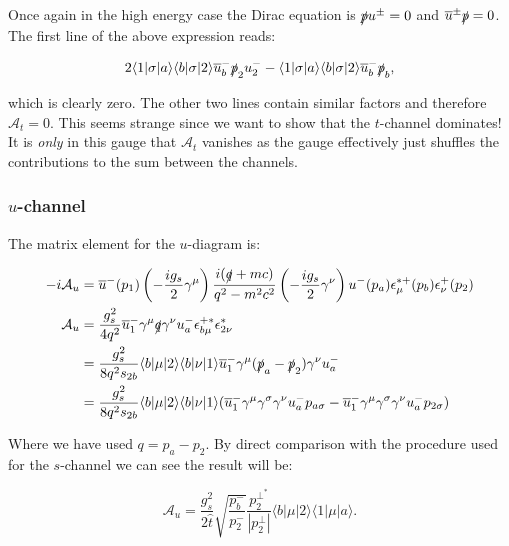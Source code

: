 			Once again in the high energy case the Dirac equation is $\slashed pu^\pm=0$ and $\overline{u}^\pm\slashed p=0$.  The first line of the above expression reads:

			\begin{equation}
			2\langle1|\sigma|a\rangle\langle b|\sigma|2\rangle\overline{u}^-_b\slashed p_2u^-_2 - \langle1|\sigma|a\rangle\langle b|\sigma|2\rangle\overline{u}^-_b\slashed p_b,
			\end{equation}

			which is clearly zero.  The other two lines contain similar factors and therefore $\mathcal{A}_t=0$.
			This seems strange since we want to show that the $t$-channel dominates!  It is \emph{only} in this
			gauge that $\mathcal{A}_t$ vanishes as the gauge effectively just shuffles the contributions to the
			sum between the channels.

		\subsubsection{$u$-channel}

		The matrix element for the $u$-diagram is:

			\begin{equation}
			\begin{split}
			-i\mathcal{A}_u &= \overline{u}^-(p_1)\left(-\frac{ig_s}{2}\gamma^\mu\right)\frac{i(\slashed q+mc)}{q^2-m^2c^2}\left(-\frac{ig_s}{2}\gamma^\nu\right)u^-(p_a)\epsilon_\mu^{*+}(p_b)\epsilon^+_\nu(p_2)\\
			\mathcal{A}_u &= \frac{g_s^2}{4q^2}\overline{u}^-_1\gamma^\mu\slashed q\gamma^\nu u^-_a\epsilon^{+*}_{b\mu}\epsilon^*_{2\nu}\\
			&= \frac{g_s^2}{8q^2s_{2b}}\langle b|\mu|2\rangle\langle b|\nu|1\rangle\overline{u}^-_1\gamma^\mu(\slashed{p}_a-\slashed{p}_2)\gamma^\nu u^-_a\\
			&= \frac{g_s^2}{8q^2s_{2b}}\langle b|\mu|2\rangle\langle b|\nu|1\rangle(\overline{u}^-_1\gamma^\mu\gamma^\sigma\gamma^\nu u^-_ap_{a\sigma} - \overline{u}^-_1\gamma^\mu\gamma^\sigma \gamma^\nu u^-_ap_{2\sigma})
			\end{split}
			\end{equation}

			Where we have used $q=p_a-p_2$.  By direct comparison with the procedure used for the $s$-channel we can see the result will be:

			\begin{equation}
			\mathcal{A}_u=\frac{g_s^2}{2\hat{t}}\sqrt{\frac{p_b^-}{p_2^-}}\frac{p_2^{\perp^*}}{|p_2^\perp|}\langle{b}|\mu|2\rangle\langle{1}|\mu|a\rangle.
			\end{equation}

